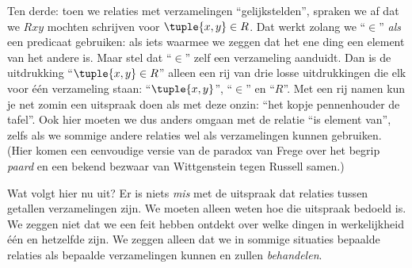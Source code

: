 \documentclass[../../../include/open-logic-section]{subfiles}
\begin{document}
Ten derde: toen we relaties met verzamelingen ``gelijkstelden'',
spraken we af dat we $Rxy$ mochten schrijven voor $\tuple{x,y} \in R$.
Dat werkt zolang we ``$\in$'' \emph{als} een predicaat gebruiken: als
iets waarmee we zeggen dat het ene ding een element van het andere is.
Maar stel dat ``$\in$'' zelf een verzameling aanduidt. Dan is de
uitdrukking ``$\tuple{x,y} \in R$'' alleen een rij van drie losse
uitdrukkingen die elk voor één verzameling staan: ``$\tuple{x,y}$'', ``$\in$''
en ``$R$''. Met een rij namen kun je net zomin een uitspraak doen als
met deze onzin: ``het kopje pennenhouder de tafel''. Ook hier moeten we
dus anders omgaan met de relatie ``is element van'', zelfs als we
sommige andere relaties wel als verzamelingen kunnen gebruiken. (Hier
komen een eenvoudige versie van de paradox van Frege over het begrip
\emph{paard} en een bekend bezwaar van Wittgenstein tegen Russell
samen.)

Wat volgt hier nu uit? Er is niets \emph{mis} met de uitspraak dat
relaties tussen getallen verzamelingen zijn. We moeten alleen weten hoe
die uitspraak bedoeld is. We zeggen niet dat we een feit hebben ontdekt
over welke dingen in werkelijkheid één en hetzelfde zijn. We zeggen alleen dat
we in sommige situaties bepaalde relaties als bepaalde verzamelingen
kunnen en zullen \emph{behandelen}.
\end{document}
